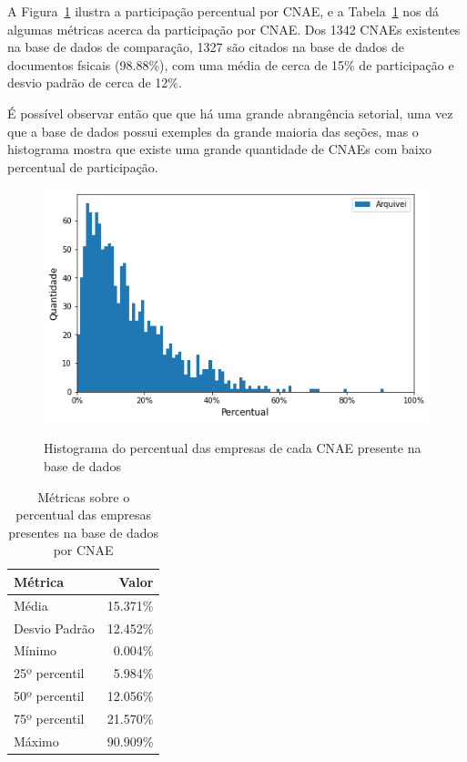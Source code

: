 A Figura~\ref{fig:base-de-dados:descritiva-9.1-presenca-por-cnae} ilustra a participação percentual por CNAE, e a Tabela~\ref{tab:participacao-por-cnae} nos dá algumas métricas acerca da participação por CNAE. Dos 1342 CNAEs existentes na base de dados de comparação, 1327 são citados na base de dados de documentos fsicais (98.88\%), com uma média de cerca de 15\% de participação e desvio padrão de cerca de 12\%.

É possível observar então que que há uma grande abrangência setorial, uma vez que a base de dados possui exemples da grande maioria das seções, mas o histograma mostra que existe uma grande quantidade de CNAEs com baixo percentual de participação.

\begin{figure}[htb]
	\centering
    \caption{Histograma do percentual das empresas de cada CNAE presente na base de dados}
    \includegraphics[scale=0.7]{images/base-de-dados-9.1-presenca-por-cnae.png}
    \label{fig:base-de-dados:descritiva-9.1-presenca-por-cnae}
    \fdadospesquisa
\end{figure}

\begin{table}[htb]
\centering
\caption{Métricas sobre o percentual das empresas presentes na base de dados por  CNAE}
\label{tab:participacao-por-cnae}
\begin{tabular}{lr}
\toprule
Métrica & Valor \\
\midrule
Média         &   15.371\% \\
Desvio Padrão &   12.452\% \\
Mínimo        &    0.004\% \\
25º percentil &    5.984\% \\
50º percentil &   12.056\% \\
75º percentil &   21.570\% \\
Máximo        &   90.909\% \\
\bottomrule
\end{tabular}
\fdadospesquisa
\end{table}
